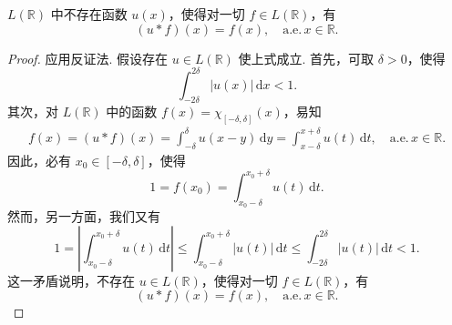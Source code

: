 \documentclass[../../main.tex]{subfiles}%
\begin{document}
\begin{proposition}[\( L \) 中无卷积单位]\label{proposition:L中无卷积单位}
\( L(\mathbb{R}) \) 中不存在函数 \( u(x) \)，使得对一切 \( f \in L(\mathbb{R}) \)，有
\[
(u * f)(x) = f(x), \quad \text{a.e.}\, x \in \mathbb{R}.
\]
\end{proposition}
\begin{proof}

应用反证法. 假设存在 \( u \in L(\mathbb{R}) \) 使上式成立. 首先，可取 \( \delta > 0 \)，使得
\[
\int_{-2\delta}^{2\delta} |u(x)| \, \mathrm{d}x < 1.
\]
其次，对 \( L(\mathbb{R}) \) 中的函数 \( f(x) = \chi_{[-\delta, \delta]}(x) \)，易知
\begin{align*}
f(x) = (u * f)(x) = \int_{-\delta}^{\delta} u(x - y) \, \mathrm{d}y = \int_{x - \delta}^{x + \delta} u(t) \, \mathrm{d}t, \quad \text{a.e.}\, x \in \mathbb{R}.
\end{align*}
因此，必有 \( x_0 \in [-\delta, \delta] \)，使得
\[
1 = f(x_0) = \int_{x_0 - \delta}^{x_0 + \delta} u(t) \, \mathrm{d}t.
\]
然而，另一方面，我们又有
\[
1 = \left| \int_{x_0 - \delta}^{x_0 + \delta} u(t) \, \mathrm{d}t \right| \leqslant  \int_{x_0 - \delta}^{x_0 + \delta} |u(t)| \, \mathrm{d}t \leqslant  \int_{-2\delta}^{2\delta} |u(t)| \, \mathrm{d}t < 1.
\]
这一矛盾说明，不存在 \( u \in L(\mathbb{R}) \)，使得对一切 \( f \in L(\mathbb{R}) \)，有
\[
(u * f)(x) = f(x), \quad \text{a.e.}\, x \in \mathbb{R}.
\]

\end{proof}
\end{document}
